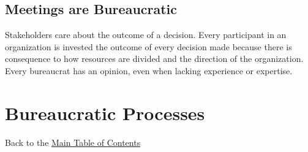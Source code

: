 \documentclass{book}
\begin{document}
    \section{Meetings are Bureaucratic\label{sec:meetings}}
    Stakeholders care about the outcome of a decision. 
    Every participant in an organization is invested the outcome of every decision made because there is consequence to how resources are divided and the direction of the organization. Every bureaucrat has an opinion, even when lacking experience or expertise. 
    
        
         
         
         
         
        
    

  \chapter{Bureaucratic Processes\label{sec:process}}
  {\footnotesize Back to the \hyperref[sec:toc]{Main Table of Contents}}
  \minitoc
     \clearpage
     \clearpage
     \clearpage
     \clearpage
     \clearpage
     \clearpage
     \clearpage
     \clearpage
     \clearpage
    \clearpage
     \clearpage





\end{document}

